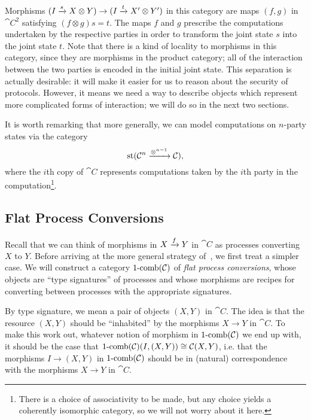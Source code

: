 Morphisms $(I\xrightarrow{s} X\otimes Y)\to(I\xrightarrow{t}X'\otimes Y')$ in this category are
maps $(f,g)$ in $\cat{C}^2$ satisfying $(f\otimes g)s = t$. The maps $f$ and $g$
prescribe the computations undertaken by the respective parties in order to
transform the joint state $s$ into the joint state $t$. Note that there is a
kind of locality to morphisms in this category, since they are morphisms in the
product category; all of the interaction between the two parties is encoded in
the initial joint state. This separation is actually desirable: it will make it
easier for us to reason about the security of protocols. However, it means we
need a way to describe objects which represent more complicated forms of
interaction; we will do so in the next two sections.

It is worth remarking that more generally, we can model computations on
$n$-party states via the category
\[
  \operatorname*{st}({\mathcal{C}}^n\xrightarrow{\otimes^{n-1}}{\mathcal{C}}),
\] where the $i$th copy of $\cat{C}$ represents computations taken by the $i$th
party in the computation\footnote{There is a choice of associativity to be made, but any
choice yields a coherently isomorphic category, so we will not worry about it
here.}.

\subsection{Flat Process Conversions}

Recall that we can think of morphisms in $X\xrightarrow{f} Y$ in $\cat{C}$ as processes
converting $X$ to $Y$. Before arriving at the more general strategy
of~\cite{broadbent-karvonen-2022}, we first treat a simpler case. We will
construct a category $\operatorname*{1-comb}({\mathcal{C}})$ of \emph{flat process conversions}, whose
objects are ``type signatures'' of processes and whose morphisms are recipes for
converting between processes with the appropriate signatures.

By type signature, we mean a pair of objects $(X, Y)$ in $\cat{C}$. The idea is
that the resource $(X, Y)$ should be ``inhabited'' by the morphisms $X\to Y$ in
$\cat{C}$. To make this work out, whatever notion of morphism in $\operatorname*{1-comb}({\mathcal{C}})$
we end up with, it should be the case that $\operatorname*{1-comb}({\mathcal{C}})(I, (X, Y)) \cong
{\mathcal{C}}(X, Y)$, i.e. that the morphisms $I\to (X, Y)$ in $\operatorname*{1-comb}({\mathcal{C}})$ should
be in (natural) correspondence with the morphisms $X\to Y$ in $\cat{C}$.

